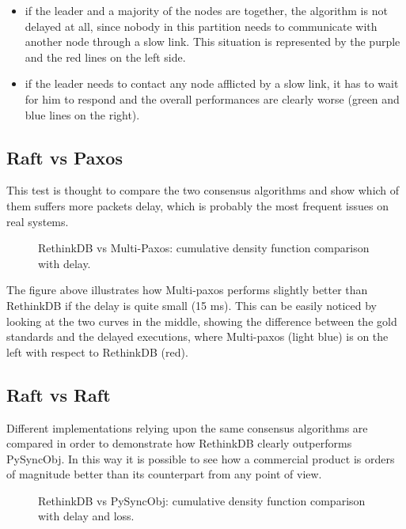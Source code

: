 \begin{itemize}
    \item if the leader and a majority of the nodes are together, the algorithm is not delayed at all, since nobody in this partition needs to communicate with another node through a slow link. This situation is represented by the purple and the red lines on the left side.
    \item if the leader needs to contact any node afflicted by a slow link, it has to wait for him to respond and the overall performances are clearly worse (green and blue lines on the right). 
\end{itemize}

\subsection{Raft vs Paxos}
This test is thought to compare the two consensus algorithms and show which of them suffers more packets delay, which is probably the most frequent issues on real systems.

\begin{figure}[H]
  \caption{RethinkDB vs Multi-Paxos: cumulative density function comparison with delay.}
\end{figure}

The figure above illustrates how Multi-paxos performs slightly better than RethinkDB if the delay is quite small (15 ms). This can be easily noticed by looking at the two curves in the middle, showing the difference between the gold standards and the delayed executions, where Multi-paxos (light blue) is on the left with respect to RethinkDB (red).

\subsection{Raft vs Raft}
Different implementations relying upon the same consensus algorithms are compared in order to demonstrate how RethinkDB clearly outperforms PySyncObj. In this way it is possible to see how a commercial product is orders of magnitude better than its counterpart from any point of view.

\begin{figure}[H]
  \caption{RethinkDB vs PySyncObj: cumulative density function comparison with delay and loss.}
\end{figure}